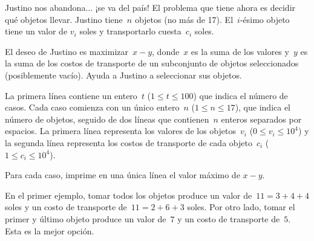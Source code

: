 
Justino nos abandona... ¡se va del país! El problema que tiene ahora es decidir qué
objetos llevar. Justino tiene~$n$ objetos (no más de 17). El~$i$-ésimo objeto tiene
un valor de $v_i$ soles y transportarlo cuesta~$c_i$ soles.

El deseo de Justino es maximizar~$x - y$, donde~$x$ es la suma de los valores y~$y$
es la suma de los costos de transporte de un subconjunto de objetos seleccionados
(posiblemente vacío). Ayuda a Justino a seleccionar sus objetos.


La primera línea contiene un entero~$t$ ($1 \leq t \leq 100$) que indica el número de
casos. Cada caso comienza con un único entero~$n$ ($1 \leq n \leq 17$), que indica el
número de objetos, seguido de dos líneas que contienen~$n$ enteros separados por
espacios. La primera línea representa los valores de los objetos~$v_i$
($0 \leq v_i \leq 10^4$) y la segunda línea representa los costos de transporte de
cada objeto~$c_i$ ($1 \leq c_i \leq 10^4$).

\outputText

Para cada caso, imprime en una única línea el valor máximo de $x - y$.

\exampleCases

\begin{example}
\end{example}

\explanationText

En el primer ejemplo, tomar todos los objetos produce un valor de~$11 = 3 + 4 + 4$
soles y un costo de transporte de~$11 = 2 + 6 + 3$ soles. Por otro lado, tomar el
primer y último objeto produce un valor de~$7$ y un costo de transporte de~$5$. Esta
es la mejor opción.
